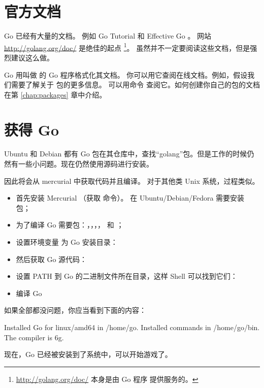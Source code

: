 \section{官方文档}
Go 已经有大量的文档。
例如 Go Tutorial \cite{go_tutorial} 和 Effective Go \cite{effective_go}。
网站 \url{http://golang.org/doc/} 是绝佳的起点 
\footnote{\url{http://golang.org/doc/} 本身是由 Go 程序  提供服务的。}。
虽然并不一定要阅读这些文档，但是强烈建议这么做。

Go 用叫做  的 Go 程序格式化其文档。
你可以用它查阅在线文档。例如，假设我们需要了解关于  包的更多信息。
可以用命令  查阅它。如何创建你自己的包的文档在第
\ref{chap:packages} 章中介绍。

\section{获得 Go}
Ubuntu 和 Debian 都有 Go 包在其仓库中，查找“golang”包。但是工作的时候仍然有一些小问题。现在仍然使用源码进行安装。

因此将会从 mercurial 中获取代码并且编译。
对于其他类 Unix 系统，过程类似。
\begin{itemize}
\item 首先安装 Mercurial （获取  命令）。
在 Ubuntu/Debian/Fedora 需要安装  包；

\item 为了编译 Go 需要包：，，，， 和 ；

\item 设置环境变量  为 Go 安装目录：
\begin{display}
\pr {}
\end{display}

\item 然后获取 Go 源代码：
\begin{display}
\pr {}
\end{display}

\item 设置 PATH 到 Go 的二进制文件所在目录，这样 Shell 可以找到它们：
\begin{display}
\pr {}
\end{display}

\item 编译 Go
\begin{display}
\pr {}
\pr {}
\end{display}
\end{itemize}
如果全部都没问题，你应当看到下面的内容：
\begin{display}
Installed Go for linux/amd64 in /home/go.
Installed commands in /home/go/bin.
The compiler is 6g.
\end{display}
现在，Go 已经被安装到了系统中，可以开始游戏了。

